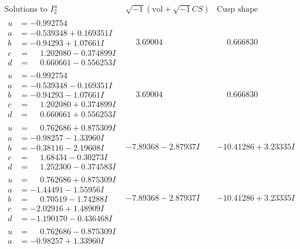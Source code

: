 \documentclass[1p]{elsarticle_modified}
\theoremstyle{definition}
\newcommand{\I}{\sqrt{-1}}
\begin{document}
$$\begin{array}{c|c|c}  
\text{Solutions to }I^u_{2}& \I (\text{vol} + \sqrt{-1}CS) & \text{Cusp shape}\\
 \hline 
\begin{aligned}
u &= -0.992754\phantom{ +0.000000I} \\
a &= -0.539348 + 0.169351 I \\
b &= -0.94293 + 1.07661 I \\
c &= \phantom{-}1.202080 - 0.374899 I \\
d &= \phantom{-}0.660661 - 0.556253 I\end{aligned}
 & \phantom{-}3.69004\phantom{ +0.000000I} & \phantom{-}0.666830\phantom{ +0.000000I} \\ \hline\begin{aligned}
u &= -0.992754\phantom{ +0.000000I} \\
a &= -0.539348 - 0.169351 I \\
b &= -0.94293 - 1.07661 I \\
c &= \phantom{-}1.202080 + 0.374899 I \\
d &= \phantom{-}0.660661 + 0.556253 I\end{aligned}
 & \phantom{-}3.69004\phantom{ +0.000000I} & \phantom{-}0.666830\phantom{ +0.000000I} \\ \hline\begin{aligned}
u &= \phantom{-}0.762686 + 0.875309 I \\
a &= -0.98257 - 1.33960 I \\
b &= -0.38116 - 2.19608 I \\
c &= \phantom{-}1.68434 - 0.30273 I \\
d &= \phantom{-}1.252300 - 0.374583 I\end{aligned}
 & -7.89368 - 2.87937 I & -10.41286 + 3.23335 I \\ \hline\begin{aligned}
u &= \phantom{-}0.762686 + 0.875309 I \\
a &= -1.44491 - 1.55956 I \\
b &= \phantom{-}0.70519 - 1.74288 I \\
c &= -2.02916 + 1.48909 I \\
d &= -1.190170 - 0.436468 I\end{aligned}
 & -7.89368 - 2.87937 I & -10.41286 + 3.23335 I \\ \hline\begin{aligned}
u &= \phantom{-}0.762686 - 0.875309 I \\
a &= -0.98257 + 1.33960 I \\

\end{aligned}
\end{array}$$
\end{document}
